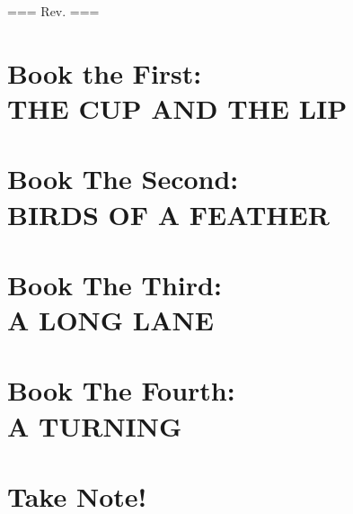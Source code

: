 \documentclass[12pt]{book}
\begin{document}
\noindent
=== Rev. \rev ===

\newpage


\part{Book the First:\\THE CUP AND THE LIP}

\part{Book The Second:\\BIRDS OF A FEATHER}

\part{Book The Third:\\A LONG LANE}

\part{Book The Fourth:\\A TURNING}

\part{Take Note!}


\end{document}
